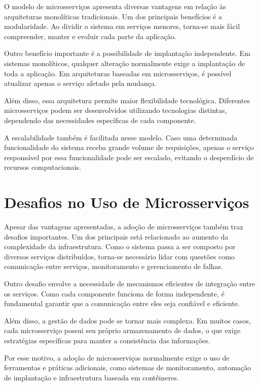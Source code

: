 \documentclass[conference]{IEEEtran}
\begin{document}
O modelo de microsserviços apresenta diversas vantagens em relação às arquiteturas monolíticas tradicionais. Um dos principais benefícios é a modularidade. Ao dividir o sistema em serviços menores, torna-se mais fácil compreender, manter e evoluir cada parte da aplicação.

Outro benefício importante é a possibilidade de implantação independente. Em sistemas monolíticos, qualquer alteração normalmente exige a implantação de toda a aplicação. Em arquiteturas baseadas em microsserviços, é possível atualizar apenas o serviço afetado pela mudança.

Além disso, essa arquitetura permite maior flexibilidade tecnológica. Diferentes microsserviços podem ser desenvolvidos utilizando tecnologias distintas, dependendo das necessidades específicas de cada componente.

A escalabilidade também é facilitada nesse modelo. Caso uma determinada funcionalidade do sistema receba grande volume de requisições, apenas o serviço responsável por essa funcionalidade pode ser escalado, evitando o desperdício de recursos computacionais.

\section{Desafios no Uso de Microsserviços}

Apesar das vantagens apresentadas, a adoção de microsserviços também traz desafios importantes. Um dos principais está relacionado ao aumento da complexidade da infraestrutura. Como o sistema passa a ser composto por diversos serviços distribuídos, torna-se necessário lidar com questões como comunicação entre serviços, monitoramento e gerenciamento de falhas.

Outro desafio envolve a necessidade de mecanismos eficientes de integração entre os serviços. Como cada componente funciona de forma independente, é fundamental garantir que a comunicação entre eles seja confiável e eficiente.

Além disso, a gestão de dados pode se tornar mais complexa. Em muitos casos, cada microsserviço possui seu próprio armazenamento de dados, o que exige estratégias específicas para manter a consistência das informações.

Por esse motivo, a adoção de microsserviços normalmente exige o uso de ferramentas e práticas adicionais, como sistemas de monitoramento, automação de implantação e infraestrutura baseada em contêineres.
\end{document}
